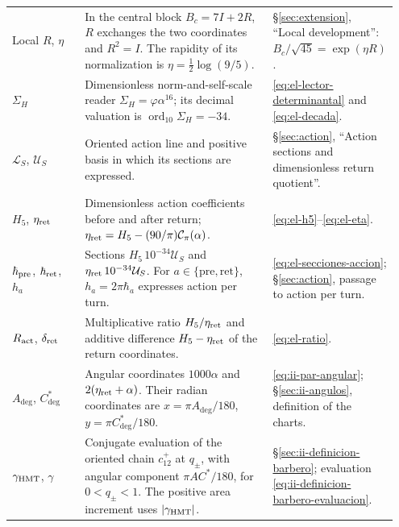\begin{longtable}{@{}>{\raggedright\arraybackslash}p{0.19\linewidth}
                    >{\raggedright\arraybackslash}p{0.49\linewidth}
                    >{\raggedright\arraybackslash}p{0.27\linewidth}@{}}
Local \(R\), \(\eta\)
& In the central block \(B_c=7I+2R\), \(R\) exchanges the two
  coordinates and \(R^2=I\). The rapidity of its normalization is
  \(\eta=\tfrac12\log(9/5)\).
& \S\ref{sec:extension}, ``Local development'':
  \(B_c/\sqrt{45}=\exp(\eta R)\).\\[3pt]

\(\Sigma_H\)
& Dimensionless norm-and-self-scale reader
  \(\Sigma_H=\varphi\alpha^{16}\); its decimal valuation is
  \(\operatorname{ord}_{10}\Sigma_H=-34\).
& \eqref{eq:el-lector-determinantal} and \eqref{eq:el-decada}.\\[3pt]

\pagebreak[4]

\(\mathcal L_S\), \(\mathcal U_S\)
& Oriented action line and positive basis in which
  its sections are expressed.
& \S\ref{sec:action}, ``Action sections and dimensionless
  return quotient''.\\[3pt]

\(H_5\), \(\eta_{\rm ret}\)
& Dimensionless action coefficients before and after return;
  \(\eta_{\rm ret}=H_5-(90/\pi)\mathcal C_\pi(\alpha)\).
& \eqref{eq:el-h5}--\eqref{eq:el-eta}.\\[3pt]

\(\hbar_{\rm pre}\), \(\hbar_{\rm ret}\), \(h_a\)
& Sections \(H_5\,10^{-34}\mathcal U_S\) and
  \(\eta_{\rm ret}\,10^{-34}\mathcal U_S\).
  For \(a\in\{\mathrm{pre},\mathrm{ret}\}\),
  \(h_a=2\pi\hbar_a\) expresses action per turn.
& \eqref{eq:el-secciones-accion};
  \S\ref{sec:action}, passage to action per turn.\\[3pt]

\(R_{\rm act}\), \(\delta_{\rm ret}\)
& Multiplicative ratio \(H_5/\eta_{\rm ret}\) and additive
  difference \(H_5-\eta_{\rm ret}\) of the return coordinates.
& \eqref{eq:el-ratio}.\\[3pt]

\(A_{\deg}\), \(C^*_{\deg}\)
& Angular coordinates \(1000\alpha\) and
  \(2(\eta_{\rm ret}+\alpha)\). Their radian coordinates are
  \(x=\pi A_{\deg}/180\), \(y=\pi C^*_{\deg}/180\).
& \eqref{eq:ii-par-angular};
  \S\ref{sec:ii-angulos}, definition of the charts.\\[3pt]

\(\gamma_{\mathrm{HMT}}\), \(\gamma\)
& Conjugate evaluation of the oriented chain \(c_{12}^{+}\) at
  \(q_\pm\), with angular component \(\pi AC^*/180\), for
  \(0<q_\pm<1\). The positive area increment uses
  \(|\gamma_{\mathrm{HMT}}|\).
& \S\ref{sec:ii-definicion-barbero};
  evaluation \eqref{eq:ii-definicion-barbero-evaluacion}.\\[3pt]


\end{longtable}
